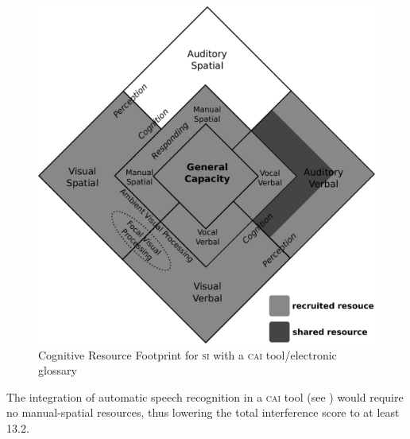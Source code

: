 \documentclass[output=paper]{langsci/langscibook}
\begin{document}
\begin{figure}
	\includegraphics[width=.7\textwidth]{figures/fig2-5.pdf}
\caption{\label{fig:prandi:5}Cognitive Resource Footprint for \textsc{si} with a \textsc{cai} tool/electronic glossary}
\end{figure}

The integration of automatic speech recognition in a \textsc{cai} tool (see \citealp{Fantinuoli2017b}) would require no manual-spatial resources, thus lowering the total interference score to at least 13.2.
\end{document}

